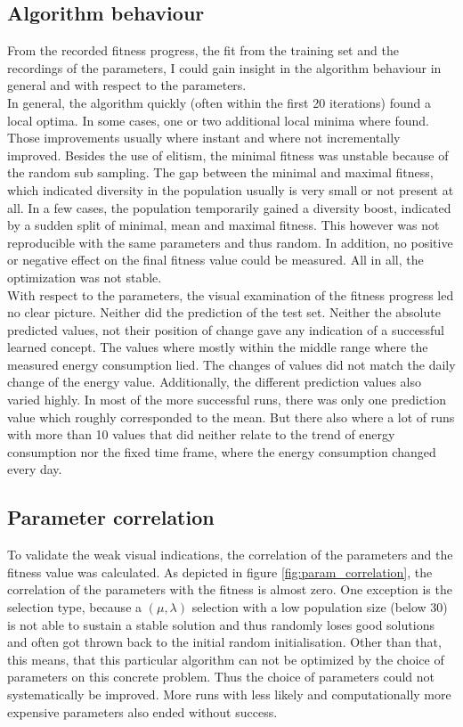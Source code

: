 \documentclass[conference]{IEEEtran}
\begin{document}
\subsection{Algorithm behaviour}
From the recorded fitness progress, the fit from the training set and the recordings of the parameters, I could gain insight in the algorithm behaviour in general and with respect to the parameters.\\
In general, the algorithm quickly (often within the first 20 iterations) found a local optima. In some cases, one or two additional local minima where found. Those improvements usually where instant and where not incrementally improved. Besides the use of elitism, the minimal fitness was unstable because of the random sub sampling. The gap between the minimal and maximal fitness, which indicated diversity in the population usually is very small or not present at all. In a few cases, the population temporarily gained a diversity boost, indicated by a sudden split of minimal, mean and maximal fitness. This however was not reproducible with the same parameters and thus random. In addition, no positive or negative effect on the final fitness value could be measured. All in all, the optimization was not stable.\\
With respect to the parameters, the visual examination of the fitness progress led no clear picture. Neither did the prediction of the test set. Neither the absolute predicted values, not their position of change gave any indication of a successful learned concept. The values where mostly within the middle range where the measured energy consumption lied. The changes of values did not match the daily change of the energy value. Additionally, the different prediction values also varied highly. In most of the more successful runs, there was only one prediction value which roughly corresponded to the mean. But there also where a lot of runs with more than 10 values that did neither relate to the trend of energy consumption nor the fixed time frame, where the energy consumption changed every day.

\subsection{Parameter correlation}
To validate the weak visual indications, the correlation of the parameters and the fitness value was calculated. As depicted in figure \ref{fig:param_correlation}, the correlation of the parameters with the fitness is almost zero. One exception is the selection type, because a $(\mu,\lambda)$ selection with a low population size (below 30) is not able to sustain a stable solution and thus randomly loses good solutions and often got thrown back to the initial random initialisation. Other than that, this means, that this particular algorithm can not be optimized by the choice of parameters on this concrete problem. Thus the choice of parameters could not systematically be improved. More runs with less likely and computationally more expensive parameters also ended without success.
\end{document}
